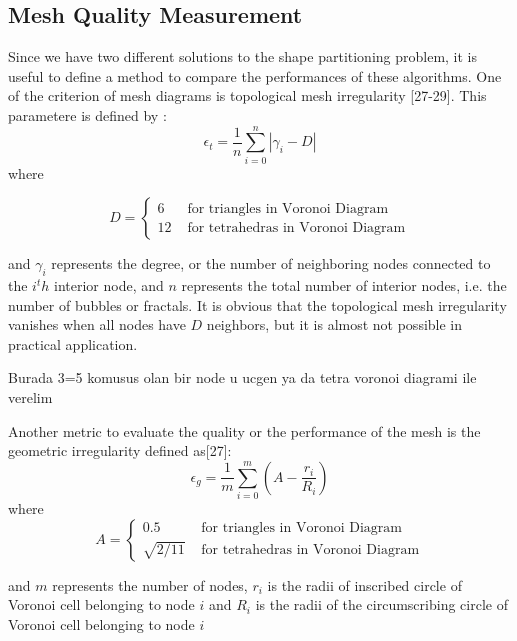 \documentclass[twoside]{article}
\begin{document}
	
	\subsection{Mesh Quality Measurement}
	Since we have two different solutions to the shape partitioning problem, it is useful to define a method to compare the performances of these algorithms. One of the criterion of mesh diagrams is topological mesh irregularity [27-29]. This parametere is defined by : 
	\begin{equation}
\epsilon _t = \frac{1}{n} \sum_{i = 0}^{n} |\gamma _i - D|
	\end{equation}
	where 
	
	
			\begin{equation}
			D = \left\{ \begin{array}{rl}
			6                               &\mbox{ for triangles in Voronoi Diagram} \\
			12                             &\mbox{ for tetrahedras in Voronoi Diagram}
			\end{array} \right.
			\end{equation}
	
	and $\gamma _i$ represents the degree, or the number of neighboring nodes connected to the $i^th$ interior node, and $n$ represents the total number of interior nodes, i.e. the number of bubbles or fractals. It is obvious that the topological mesh irregularity vanishes when all nodes have $D$ neighbors, but it is almost not possible in practical application. 
	
	Burada 3=5 komusus olan bir node u ucgen ya da tetra voronoi diagrami ile verelim
	
	Another metric to evaluate the quality or the performance of the mesh is the geometric irregularity defined as[27]:
	\begin{equation}
\epsilon _g = \frac{1}{m} \sum_{i = 0}^{m} (A-\frac{r_i}{R_i})
	\end{equation}
	where 
		\begin{equation}
		A = \left\{ \begin{array}{rl}
		0.5                               &\mbox{ for triangles in Voronoi Diagram} \\
		\sqrt{2/11}                   &\mbox{ for tetrahedras in Voronoi Diagram}
		\end{array} \right.
		\end{equation}
		
		and $m$ represents the number of nodes, $r_i$ is the radii of inscribed circle of Voronoi cell belonging to node $i$ and $R_i$ is the radii of the circumscribing circle of Voronoi cell belonging to node $i$
	
\end{document}
